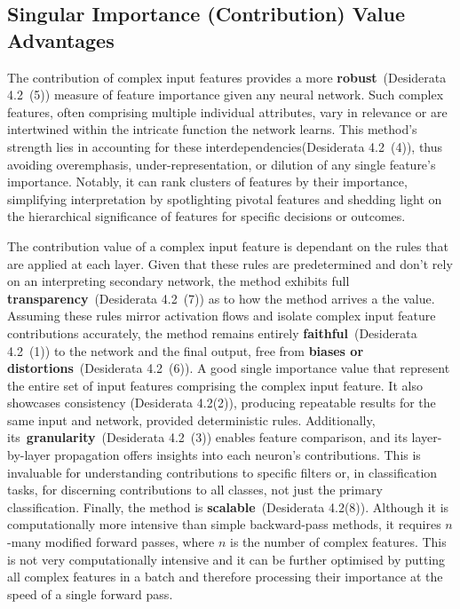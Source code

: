 \subsection{Singular Importance (Contribution) Value Advantages}

The contribution of complex input features provides a more \textbf{robust}~(Desiderata 4.2~(5)) measure of feature importance given any neural network. Such complex features, often comprising multiple individual attributes, vary in relevance or are intertwined within the intricate function the network learns. This method's strength lies in accounting for these interdependencies(Desiderata 4.2~(4)), thus avoiding overemphasis, under-representation, or dilution of any single feature's importance. Notably, it can rank clusters of features by their importance, simplifying interpretation by spotlighting pivotal features and shedding light on the hierarchical significance of features for specific decisions or outcomes.


The contribution value of a complex input feature is dependant on the rules that are applied at each layer. Given that these rules are predetermined and don't rely on an interpreting secondary network, the method exhibits full \textbf{transparency}~(Desiderata 4.2~(7)) as to how the method arrives a the value. Assuming these rules mirror activation flows and isolate complex input feature contributions accurately, the method remains entirely \textbf{faithful}~(Desiderata 4.2~(1)) to the network and the final output, free from \textbf{biases or distortions}~(Desiderata 4.2~(6)). A good single importance value that represent the entire set of input features comprising the complex input feature. It also showcases consistency (Desiderata 4.2(2)), producing repeatable results for the same input and network, provided deterministic rules. Additionally, its~\textbf{granularity}~(Desiderata 4.2~(3)) enables feature comparison, and its layer-by-layer propagation offers insights into each neuron's contributions. This is invaluable for understanding contributions to specific filters or, in classification tasks, for discerning contributions to all classes, not just the primary classification. Finally, the method is \textbf{scalable}~(Desiderata 4.2(8)). Although it is computationally more intensive than simple backward-pass methods, it requires $n$-many modified forward passes, where $n$ is the number of complex features. This is not very computationally intensive and it can be further optimised by putting all complex features in a batch and therefore processing their importance at the speed of a single forward pass.


